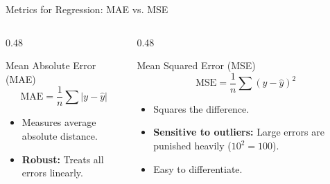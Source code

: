 \begin{frame}{Metrics for Regression: MAE vs. MSE}

    \begin{columns}[T]
        \begin{column}{0.48\textwidth}
            \begin{block}{Mean Absolute Error (MAE)}
                \centering
                $$ \text{MAE} = \frac{1}{n} \sum |y - \hat{y}| $$
                \begin{itemize}
                    \item Measures average absolute distance.
                    \item \textbf{Robust:} Treats all errors linearly.
                \end{itemize}
            \end{block}
        \end{column}
        
        \begin{column}{0.48\textwidth}
            \begin{block}{Mean Squared Error (MSE)}
                \centering
                $$ \text{MSE} = \frac{1}{n} \sum (y - \hat{y})^2 $$
                \begin{itemize}
                    \item Squares the difference.
                    \item \textbf{Sensitive to outliers:} Large errors are punished heavily ($10^2 = 100$).
                    \item Easy to differentiate.
                \end{itemize}
            \end{block}
        \end{column}
    \end{columns}

\end{frame}

